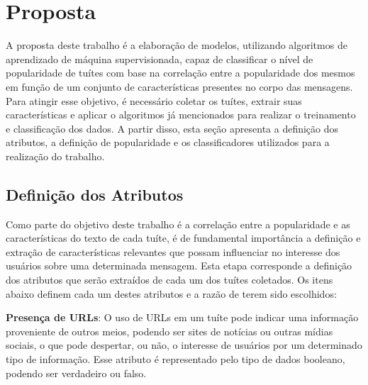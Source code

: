 \documentclass[oneside,openright,12pt]{ufsm_2015} %
\begin{document}

\chapter{Proposta}
\label{sec:proposta}

    \par A proposta deste trabalho é a elaboração de modelos, utilizando algoritmos de aprendizado de máquina supervisionada, capaz de classificar o nível de popularidade de tuítes com base na correlação entre a popularidade dos mesmos em função de um conjunto de características presentes no corpo das mensagens. Para atingir esse objetivo, é necessário coletar os tuítes, extrair suas características e aplicar o algoritmos já mencionados para realizar o treinamento e classificação dos dados. A partir disso, esta seção apresenta a definição dos atributos, a definição de popularidade e os classificadores utilizados para a realização do trabalho.


\section{Definição dos Atributos}
\label{sec:def-atributos}

    \par Como parte do objetivo deste trabalho é a correlação entre a popularidade e as características do texto de cada tuíte, é de fundamental importância a definição e extração de características relevantes que possam influenciar no interesse dos usuários sobre uma determinada mensagem. Esta etapa corresponde a definição dos atributos que serão extraídos de cada um dos tuítes coletados. Os itens abaixo definem cada um destes atributos e a razão de terem sido escolhidos:

    \par \textbf{Presença de URLs}: O uso de URLs em um tuíte pode indicar uma informação proveniente de outros meios, podendo ser sites de notícias ou outras mídias sociais, o que pode despertar, ou não, o interesse de usuários por um determinado tipo de informação. Esse atributo é representado pelo tipo de dados booleano, podendo ser verdadeiro ou falso.
\end{document}
